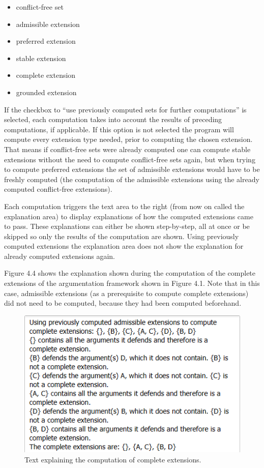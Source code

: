 \documentclass[draft,final]{vutinfth} %
\newcommand{\hl}{\par\vspace{6pt}} %
\begin{document}
\begin{itemize}[noitemsep]
	\item conflict-free set
	\item admissible extension
	\item preferred extension
	\item stable extension
	\item complete extension
	\item grounded extension
\end{itemize}

If the checkbox to ``use previously computed sets for further computations'' is selected, each computation takes into account the results of preceding computations, if applicable. If this option is not selected the program will compute every extension type needed, prior to computing the chosen extension.\\
That means if conflict-free sets were already computed one can compute stable extensions without the need to compute conflict-free sets again, but when trying to compute preferred extensions the set of admissible extensions would have to be freshly computed (the computation of the admissible extensions using the already computed conflict-free extensions).\hl
Each computation triggers the text area to the right (from now on called the explanation area) to display explanations of how the computed extensions came to pass. These explanations can either be shown step-by-step, all at once or be skipped so only the results of the computation are shown. Using previously computed extensions the explanation area does not show the explanation for already computed extensions again.\hl
Figure 4.4 shows the explanation shown during the computation of the complete extensions of the argumentation framework shown in Figure 4.1. Note that in this case, admissible extensions (as a prerequisite to compute complete extensions) did not need to be computed, because they had been computed beforehand.

\FloatBarrier
	\begin{figure}[!h]
		\centering
		\includegraphics[scale=0.9]{pics/steps.png}
		\caption{Text explaining the computation of complete extensions.}
	\end{figure}
\FloatBarrier
\end{document}
